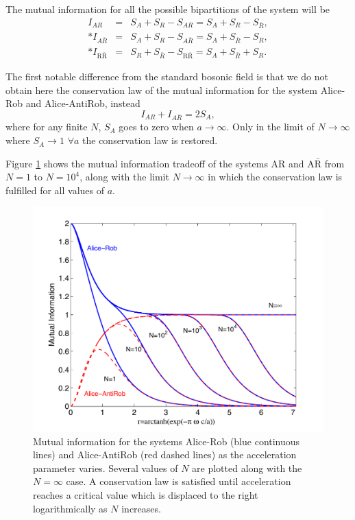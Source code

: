 The mutual information for all the possible bipartitions of the system will be
\begin{eqnarray}
\nonumber I_{AR}&=&S_A+S_R-S_{A R}=S_A+S_R -S_{\bar R},\\*
\nonumber I_{A\bar R}&=&S_A+S_R-S_{A\bar R}=S_A+ S_{\bar R}-S_R,\\*
\nonumber I_{\text{R}{\bar{\text{R}}}}&=& S_R+S_{\bar R}-S_{\text{R}{\bar{\text{R}}}}=S_A+ S_{\bar R}+S_R.
\end{eqnarray}  

The first notable difference from the standard bosonic field is that we do not obtain here the conservation law of the mutual information for the system Alice-Rob and Alice-AntiRob, instead
\begin{equation}\label{noconservationbos}
 I_{AR} + I_{A\bar R}=2S_{A},
\end{equation}
where for any finite $N$, $S_A$ goes to zero when $a\rightarrow\infty$. Only in the limit of $N\rightarrow\infty$ where $S_{A}\rightarrow 1$  $\forall a$ the conservation law is restored. 

Figure \ref{MutuARAAR1} shows  the mutual information tradeoff of the systems AR and $\text{A}{\bar{\text{R}}}$ from $N=1$ to $N=10^4$, along with the limit $N\rightarrow\infty$ in which the conservation law is fulfilled for all values of $a$. 
\begin{figure}[h]
\begin{center}
\includegraphics[width=.85\textwidth]{MutuARAAR1}
\end{center}
\caption{ Mutual information for the systems Alice-Rob (blue continuous lines) and Alice-AntiRob (red dashed lines) as the acceleration parameter varies. Several values of $N$ are plotted along with the $N=\infty$ case. A conservation law is satisfied until acceleration reaches a critical value which is displaced to the right logarithmically as $N$ increases.}
\label{MutuARAAR1}
\end{figure}


